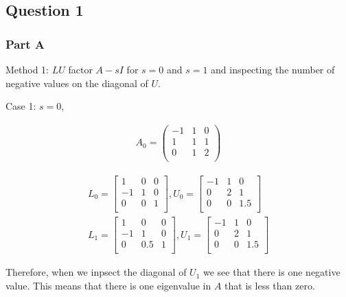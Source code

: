 \subsection{Question 1}
\subsubsection{Part A}

Method 1: \(LU\) factor \(A-sI\) for \(s=0\) and \(s=1\) and inspecting the number of negative values on the diagonal of \(U\).

Case 1: \(s=0\),

\begin{eqnarray}
  A_0 = 
  \begin{pmatrix}
    -1 & 1 & 0 \\
    1 & 1 & 1 \\
    0 & 1 & 2 \\
  \end{pmatrix}
\end{eqnarray}

\begin{eqnarray}
  L_0 =
  \begin{bmatrix}
    1 & 0 & 0 \\
    -1 & 1 & 0 \\
    0 & 0 & 1 \\
  \end{bmatrix}
  , U_0 =
  \begin{bmatrix}
    -1 & 1 & 0 \\
    0 & 2 & 1 \\
    0 & 0 & 1.5 \\
  \end{bmatrix}
  \\
  L_1 = 
  \begin{bmatrix}
    1 & 0 & 0 \\
    -1 & 1 & 0 \\
    0 & 0.5 & 1 \\
  \end{bmatrix}
  , U_1 = 
  \begin{bmatrix}
    -1 & 1 & 0 \\
    0 & 2 & 1 \\
    0 & 0 & 1.5 \\
  \end{bmatrix}
\end{eqnarray}

Therefore, when we inpsect the diagonal of \(U_1\) we see that there is one negative value.
This means that there is one eigenvalue in \(A\) that is less than zero.

